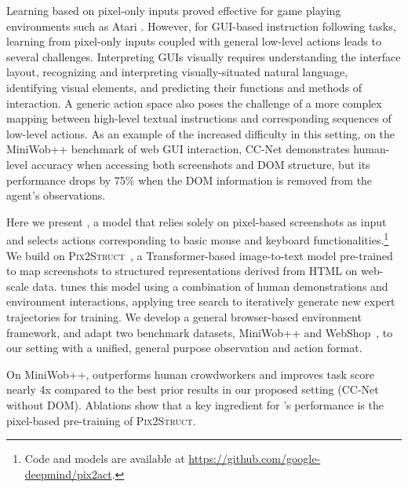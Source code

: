 Learning based on pixel-only inputs proved effective for game playing environments such as Atari \citep{Mnih2015HumanlevelCT}. However, for GUI-based instruction following tasks, learning from pixel-only inputs coupled with general low-level actions leads to several challenges.
Interpreting GUIs visually requires understanding the interface layout, recognizing and interpreting visually-situated natural language, identifying visual elements, and predicting their functions and methods of interaction. A generic action space also poses the challenge of a more complex mapping between high-level textual instructions and corresponding sequences of low-level actions. As an example of the increased difficulty in this setting, on the MiniWob++ benchmark \citep{shi2017world,liu2018reinforcement} of web GUI interaction, CC-Net \citep{humphreys2022data} demonstrates human-level accuracy when accessing both screenshots and DOM structure, but its performance drops by 75\% when the DOM information is removed from the agent's observations.

Here we present \ours, a model that relies solely on pixel-based screenshots as input and selects actions corresponding to basic mouse and keyboard functionalities.\footnote{Code and models are available at \url{https://github.com/google-deepmind/pix2act}.}
We build on {\textsc{Pix2Struct}}~\citep{lee2022pix2struct}, a Transformer-based \citep{vaswani2017attention} image-to-text model pre-trained to map screenshots to structured  representations derived from HTML on web-scale data.
\ours tunes this model using a combination of human demonstrations and environment interactions, applying tree search to iteratively generate new expert trajectories for training. We develop a general browser-based environment framework, and adapt two benchmark datasets, MiniWob++ and WebShop~\citep{yao2022webshop}, to our setting with a unified, general purpose observation and action format.

On MiniWob++, \ours outperforms human crowdworkers and improves task score nearly 4x compared to the best prior results in our proposed setting (CC-Net without DOM).  Ablations show that a key ingredient for \ours's performance is the pixel-based pre-training of {\textsc{Pix2Struct}}. 

